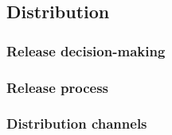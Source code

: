 \documentclass{article}
\begin{document}
\subsection{Distribution}
\subsubsection{Release decision-making}


\subsubsection{Release process}


\subsubsection{Distribution channels}

\end{document}
